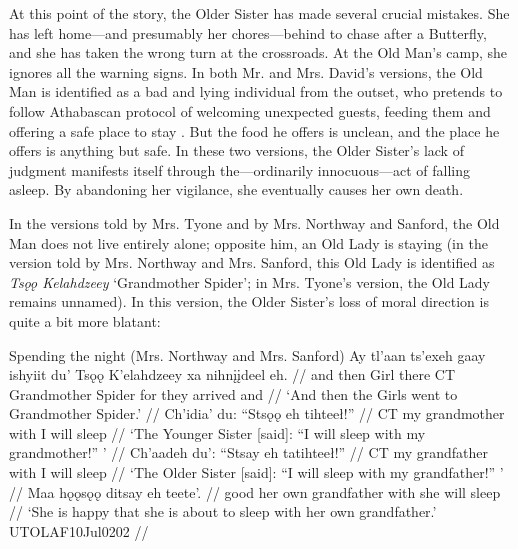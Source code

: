 At this point of the story, the Older Sister has made several crucial mistakes. She has left home—and presumably her chores—behind to chase after a Butterfly, and she has taken the wrong turn at the crossroads. At the Old Man's camp, she ignores all the warning signs. In both Mr. and Mrs. David's versions, the Old Man is identified as a bad and lying individual from the outset, who pretends to follow Athabascan protocol of welcoming unexpected guests, feeding them and offering a safe place to stay \citep[140]{GuedonM1974}. But the food he offers is unclean, and the place he offers is anything but safe. In these two versions, the Older Sister's lack of judgment manifests itself through the—ordinarily innocuous—act of falling asleep. By abandoning her vigilance, she eventually causes her own death.

In the versions told by Mrs. Tyone and by Mrs. Northway and Sanford, the Old Man does not live entirely alone; opposite him, an Old Lady is staying (in the version told by Mrs. Northway and Mrs. Sanford, this Old Lady is identified as {\em Tsǫǫ Kelahdzeey} `Grandmother Spider'; in Mrs. Tyone's version, the Old Lady remains unnamed). In this version, the Older Sister's loss of moral direction is quite a bit more blatant:

\pex Spending the night (Mrs. Northway and Mrs. Sanford) 
\a
\begingl
\gla Ay tl'aan {ts'exeh gaay} ishyiit du' Tsǫǫ K'elahdzeey xa nihnįįdeel eh.  //
\glb and then Girl there CT Grandmother Spider for {they arrived} and //
\glft `And then the Girls went to Grandmother Spider.' //
\endgl
\a
\begingl
\gla Ch'idia' du: ``Stsǫǫ eh tihteeł!''  //
 CT {my grandmother} with {I will sleep} //
\glft `The Younger Sister [said]: ``I will sleep with my grandmother!'' ' //
\endgl
\a
\begingl
\gla Ch'aadeh du': ``Stsay eh tatihteeł!''  //
 CT {my grandfather} with {I will sleep} //
\glft `The Older Sister [said]: ``I will sleep with my grandfather!'' ' //
\endgl
\a
\begingl
\gla Maa hǫǫsǫǫ ditsay eh teete'.  //
 good {her own grandfather} with {she will sleep} //
\glft `She is happy that she is about to sleep with her own grandfather.' \trailingcitation UTOLAF10Jul0202 //
\endgl
\xe

